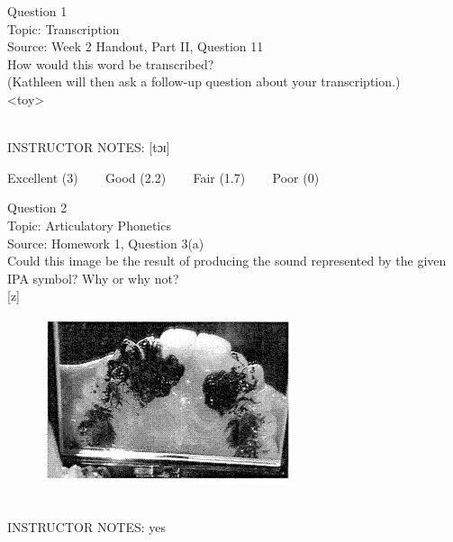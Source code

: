 \documentclass[12pt]{article}
\begin{document}
\begin{center}
\textbf{{\color{blue}{\HUGE START OF EXAM\\}}}

\textbf{{\color{blue}{\HUGE Student ID: 44746\\}}}

\textbf{{\color{blue}{\HUGE \\}}}

\end{center}
\newpage

{\large Question 1}\\

Topic: Transcription\\
Source: Week 2 Handout, Part II, Question 11\\

How would this word be transcribed?\\ (Kathleen will then ask a follow-up question about your transcription.)\\

<toy>


~\\
INSTRUCTOR NOTES: [tɔɪ]


\vfill
Excellent (3) ~~~ Good (2.2) ~~~ Fair (1.7) ~~~ Poor (0)
\newpage

{\large Question 2}\\

Topic: Articulatory Phonetics\\
Source: Homework 1, Question 3(a)\\

Could this image be the result of producing the sound represented by the given IPA symbol? Why or why not?\\

{[z]}

\begin{figure}[H]
\includegraphics{../images/staticpalatography_fricative.png}
\end{figure}

~\\
INSTRUCTOR NOTES: yes
\end{document}
